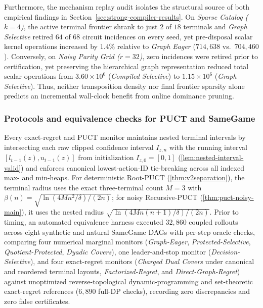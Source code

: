 \documentclass{article}
\theoremstyle{plain}
\theoremstyle{definition}
\begin{document}
Furthermore, the mechanism replay audit isolates the structural source of both empirical findings in Section~\ref{sec:strong-compiler-results}. On \emph{Sparse Catalog ($k=4$)}, the active terminal frontier shrank to just $2$ of $18$ terminals and \emph{Graph Selective} retired $64$ of $68$ circuit incidences on every seed, yet pre-disposal scalar kernel operations increased by $1.4\%$ relative to \emph{Graph Eager} ($714{,}638$ vs.\ $704{,}460$). Conversely, on \emph{Noisy Parity Grid ($r=32$)}, zero incidences were retired prior to certification, yet preserving the hierarchical graph representation reduced total scalar operations from $3.60\times 10^6$ (\emph{Compiled Selective}) to $1.15\times 10^6$ (\emph{Graph Selective}). Thus, neither transposition density nor final frontier sparsity alone predicts an incremental wall-clock benefit from online dominance pruning.

\subsubsection{Protocols and equivalence checks for PUCT and SameGame}
\label{app:v2-extensions}

Every exact-regret and PUCT monitor maintains nested terminal intervals by intersecting each raw clipped confidence interval $I_{z,n}$ with the running interval $[l_{t-1}(z), u_{t-1}(z)]$ from initialization $I_{z,0} = [0,1]$ (\cref{lem:nested-interval-valid}) and enforces canonical lowest-action-ID tie-breaking across all indexed max- and min-heaps. For deterministic Root-PUCT (\cref{thm:v2separation}), the terminal radius uses the exact three-terminal count $M=3$ with $\beta(n) = \sqrt{\ln(4Mn^2/\delta)/(2n)}$; for noisy Recursive-PUCT (\cref{thm:puct-noisy-main}), it uses the nested radius $\sqrt{\ln(4Mn(n+1)/\delta)/(2n)}$. Prior to timing, an automated equivalence harness executed $32{,}860$ coupled rollouts across eight synthetic and natural SameGame DAGs with per-step oracle checks, comparing four numerical marginal monitors (\emph{Graph-Eager}, \emph{Protected-Selective}, \emph{Quotient-Protected}, \emph{Dyadic Covers}), one leader-and-stop monitor (\emph{Decision-Selective}), and four exact-regret monitors (\emph{Charged Dual Covers} under canonical and reordered terminal layouts, \emph{Factorized-Regret}, and \emph{Direct-Graph-Regret}) against unoptimized reverse-topological dynamic-programming and set-theoretic exact-regret references ($6{,}890$ full-DP checks), recording zero discrepancies and zero false certificates.
\end{document}
